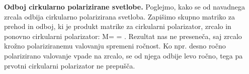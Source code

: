 \begin{example}{\bf Odboj cirkularno polarizirane svetlobe.}
Poglejmo, kako se od navadnega zrcala odbija cirkularno
polarizirana svetloba. Zapišimo skupno matriko za prehod in odboj,
ki je produkt matrike za cirkularni polarizator, zrcalo in ponovno
cirkularni polarizator:
\beq
M= \left[\begin{array}{cc}
1 & i \\
-i & 1\\
\end{array}\right]\cdot 
\left[\begin{array}{cc}
1 & 0 \\
0 & -1\\
\end{array}\right]
\cdot 
\left[\begin{array}{cc}
1 &  i \\
-i & 1\\
\end{array}\right]=
\left[\!\!\begin{array}{cc}
0 & 0\\
0 & 0\\
\end{array}\right]\!\!.
\label{eq:03_64}
\eeq
Rezultat nas ne preseneča, saj zrcalo krožno polariziranemu valovanju
spremeni ročnost. Ko npr. desno ročno polarizirano valovanje vpade
na zrcalo, se od njega odbije levo ročno, tega pa prvotni cirkularni 
polarizator ne prepušča.
\end{example}


